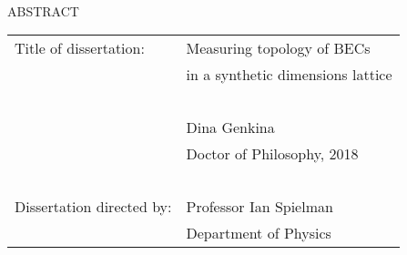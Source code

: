
\hbox{\ }

\renewcommand{\baselinestretch}{1}
\small \normalsize

\begin{center}
\large{{ABSTRACT}}

\vspace{3em}

\end{center}
\hspace{-.15in}
\begin{tabular}{ll}
Title of dissertation:    & {\large  Measuring topology of BECs}\\
&                     {\large in a synthetic dimensions lattice} \\
\ \\
&                          {\large  Dina Genkina} \\
&                           {\large Doctor of Philosophy, 2018} \\
\ \\
Dissertation directed by: & {\large  Professor Ian Spielman} \\
&               {\large  Department of Physics } \\
\end{tabular}

\vspace{3em}

\renewcommand{\baselinestretch}{2}
\large \normalsize


